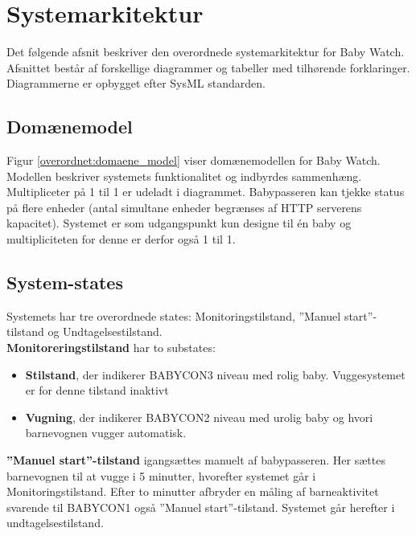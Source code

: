 \section{Systemarkitektur}

Det følgende afsnit beskriver den overordnede systemarkitektur for Baby Watch. Afsnittet består af forskellige diagrammer og tabeller med tilhørende forklaringer. Diagrammerne er opbygget efter SysML standarden.

\subsection{Domænemodel}

Figur \ref{overordnet:domaene_model} viser domænemodellen for Baby Watch. Modellen beskriver systemets funktionalitet og indbyrdes sammenhæng. Multipliceter på 1 til 1 er udeladt i diagrammet. Babypasseren kan tjekke status på flere enheder (antal simultane enheder begrænses af HTTP serverens kapacitet). Systemet er som udgangspunkt kun designe til én baby og multipliciteten for denne er derfor også 1 til 1.

\subsection{System-states}

Systemets har tre overordnede states: Monitoringstilstand, ''Manuel start''-tilstand og Undtagelsestilstand. \\\textbf{Monitoreringstilstand} har to substates: 
\begin{itemize}
	\item \textbf{Stilstand}, der indikerer BABYCON3 niveau med rolig baby. Vuggesystemet er for denne tilstand inaktivt
	\item \textbf{Vugning}, der indikerer BABYCON2 niveau med urolig baby og hvori barnevognen vugger automatisk.
\end{itemize}

\textbf{''Manuel start''-tilstand} igangsættes manuelt af babypasseren. Her sættes barnevognen til at vugge i 5 minutter, hvorefter systemet går i Monitoringstilstand. Efter to minutter afbryder en måling af barneaktivitet svarende til BABYCON1 også ''Manuel start''-tilstand. Systemet går herefter i undtagelsestilstand.

